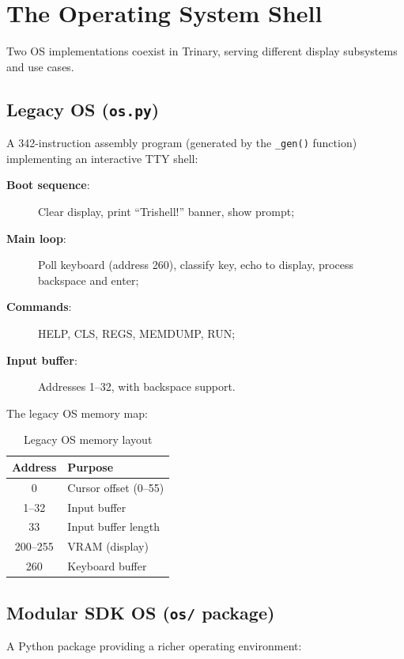\documentclass[10pt,a4paper,twoside]{book}
\begin{document}
\chapter{The Operating System Shell}
\label{ch:os}

Two OS implementations coexist in Trinary, serving different display subsystems and
use cases.

\section{Legacy OS (\texttt{os.py})}

A 342-instruction assembly program (generated by the \texttt{\_gen()} function)
implementing an interactive TTY shell:

\begin{description}
    \item[\textbf{Boot sequence}:] Clear display, print ``Trishell!'' banner, show
          prompt;
    \item[\textbf{Main loop}:] Poll keyboard (address 260), classify key, echo to
          display, process backspace and enter;
    \item[\textbf{Commands}:] HELP, CLS, REGS, MEMDUMP, RUN;
    \item[\textbf{Input buffer}:] Addresses 1--32, with backspace support.
\end{description}

The legacy OS memory map:
\begin{table}[H]
\centering
\caption{Legacy OS memory layout}
\label{tab:osmem}
\begin{tabular}{cl}
\toprule
Address & Purpose \\
\midrule
0 & Cursor offset (0--55) \\
1--32 & Input buffer \\
33 & Input buffer length \\
200--255 & VRAM (display) \\
260 & Keyboard buffer \\
\bottomrule
\end{tabular}
\end{table}

\section{Modular SDK OS (\texttt{os/} package)}

A Python package providing a richer operating environment:
\end{document}
